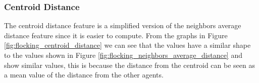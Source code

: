\documentclass[../../Thesis.tex]{subfiles}
\begin{document}
			\subsubsection{Centroid Distance}
				The centroid distance feature is a simplified version of the neighbors average distance feature since it is easier to compute. From the graphs in Figure \ref{fig:flocking_centroid_distance} we can see that the values have a similar shape to the values shown in Figure \ref{fig:flocking_neighbors_average_distance} and show similar values, this is because the distance from the centroid can be seen as a mean value of the distance from the other agents.
				\begin{figure}
					\centering
					\quad
\end{figure}
\end{document}
